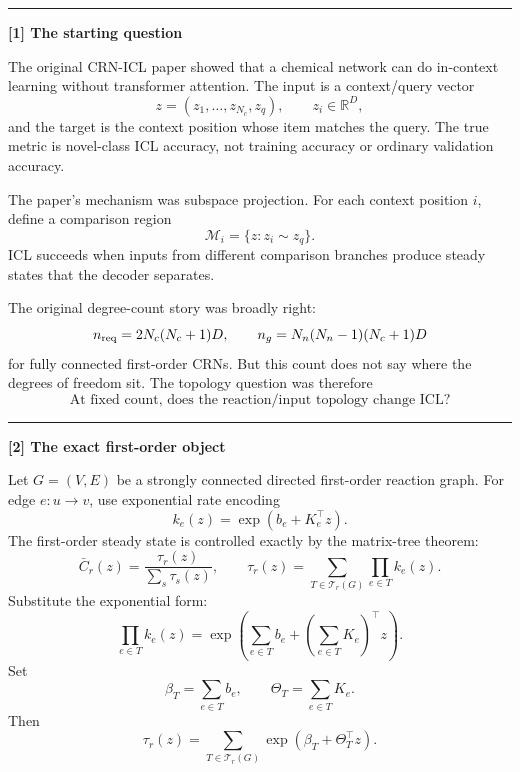 \documentclass[11pt]{article}
\newcommand{\R}{\mathbb R}
\newcommand{\T}{\mathcal T}
\newcommand{\M}{\mathcal M}
\newcommand{\Cbar}{\bar C}
\begin{document}
\vspace{1em}
\noindent\rule{\textwidth}{0.4pt}
\vspace{1em}

\noindent\textbf{[1] The starting question}

\vspace{0.5em}
\noindent The original CRN-ICL paper showed that a chemical network can do in-context learning without transformer attention. The input is a context/query vector
\[
z=(z_1,\ldots,z_{N_c},z_q),\qquad z_i\in\R^D,
\]
and the target is the context position whose item matches the query. The true metric is novel-class ICL accuracy, not training accuracy or ordinary validation accuracy.

\vspace{0.5em}
\noindent The paper's mechanism was subspace projection. For each context position $i$, define a comparison region
\[
\M_i=\{z:z_i\sim z_q\}.
\]
ICL succeeds when inputs from different comparison branches produce steady states that the decoder separates.

\vspace{0.5em}
\noindent The original degree-count story was broadly right:
\[
n_{\rm req}=2N_c(N_c+1)D,
\qquad
n_g=N_n(N_n-1)(N_c+1)D
\]
for fully connected first-order CRNs. But this count does not say where the degrees of freedom sit. The topology question was therefore
\[
\boxed{\text{At fixed count, does the reaction/input topology change ICL?}}
\]

\vspace{1em}
\noindent\rule{\textwidth}{0.4pt}
\vspace{1em}

\noindent\textbf{[2] The exact first-order object}

\vspace{0.5em}
\noindent Let $G=(V,E)$ be a strongly connected directed first-order reaction graph. For edge $e:u\to v$, use exponential rate encoding
\[
k_e(z)=\exp(b_e+K_e^\top z).
\]
The first-order steady state is controlled exactly by the matrix-tree theorem:
\[
\Cbar_r(z)=\frac{\tau_r(z)}{\sum_s\tau_s(z)},
\qquad
\tau_r(z)=\sum_{T\in\T_r(G)}\prod_{e\in T}k_e(z).
\]
Substitute the exponential form:
\[
\prod_{e\in T}k_e(z)
=
\exp\left(\sum_{e\in T}b_e+\left(\sum_{e\in T}K_e\right)^\top z\right).
\]
Set
\[
\beta_T=\sum_{e\in T}b_e,
\qquad
\Theta_T=\sum_{e\in T}K_e.
\]
Then
\[
\boxed{\;\tau_r(z)=\sum_{T\in\T_r(G)}\exp(\beta_T+\Theta_T^\top z).\;}
\]
\end{document}
